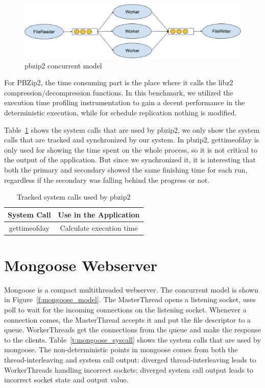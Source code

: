 \begin{figure}
\centering
\includegraphics[width=0.8\columnwidth]{figures/pbzip2_model}
\caption{pbzip2 concurrent model}
\label{f:pbzip_model}
\end{figure}

For PBZip2, the time consuming part is the place where it calls the libz2 compression/decompression functions. In this benchmark, we utilized the execution time profiling instrumentation to gain a decent performance in the deterministic execution, while for schedule replication nothing is modified.

Table~\ref{t:pbzip2_syscall} shows the system calls that are used by pbzip2, we only show the system calls that are tracked and synchronized by our system. In pbzip2,  gettimeofday is only used for showing the time spent on the whole process, so it is not critical to the output of the application. But since we synchronized it, it is  interesting that both the primary and secondary showed the same finishing time for each run, regardless if the secondary was falling behind the progress or not.

\begin{table}
 \caption{Tracked system calls used by pbzip2}
\begin{center}
 \begin{tabular}{c | c}
 System Call & Use in the Application\\ \hline
 gettimeofday & Calculate execution time
 \end{tabular}
\end{center}
\label{t:pbzip2_syscall}
\end{table}

\section{Mongoose Webserver}

Mongoose is a compact multithreaded webserver. The concurrent model is shown in Figure~\ref{f:mongoose_model}. The MasterThread opens a listening socket, uses poll to wait for the incoming connections on the listening socket. Whenever a connection comes, the MasterThread accepts it and put the file descriptor to a queue. WorkerThreads get the connections from the queue and make the response to the clients. Table~\ref{t:mongoose_syscall} shows the system calls that are used by mongoose. The non-deterministic points in mongoose comes from both the thread-interleaving and system call output: diverged thread-interleaving leads to WorkerThreads handling incorrect sockets; diverged system call output leads to incorrect socket state and output value.

